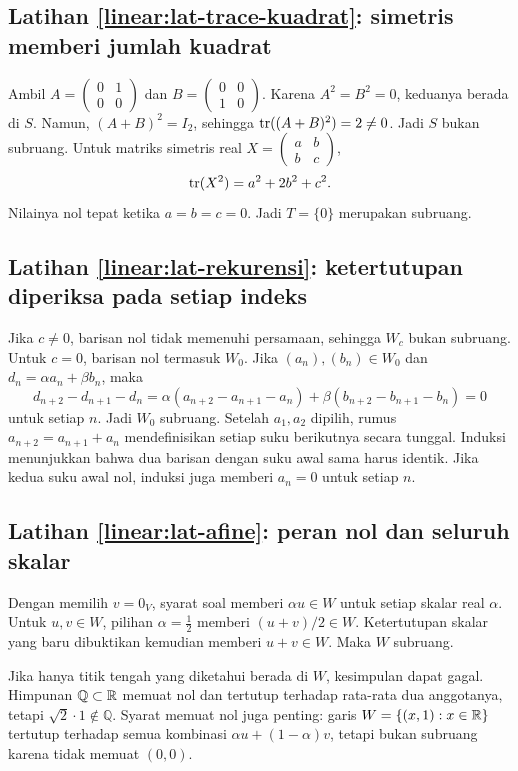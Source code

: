     \subsection*{Latihan \ref{linear:lat-trace-kuadrat}: simetris memberi jumlah kuadrat}
    Ambil $A=\begin{pmatrix}0&1\\0&0\end{pmatrix}$ dan
    $B=\begin{pmatrix}0&0\\1&0\end{pmatrix}$.
    Karena $A^2=B^2=0$, keduanya berada di $S$.
    Namun, $(A+B)^2=I_2$, sehingga $\operatorname{tr}((A+B)^2)=2\ne0$.
    Jadi $S$ bukan subruang.
    Untuk matriks simetris real $X=\begin{pmatrix}a&b\\b&c\end{pmatrix}$,
    \[
        \operatorname{tr}(X^2)=a^2+2b^2+c^2.
    \]
    Nilainya nol tepat ketika $a=b=c=0$. Jadi $T=\{0\}$ merupakan subruang.

    \subsection*{Latihan \ref{linear:lat-rekurensi}: ketertutupan diperiksa pada setiap indeks}
    Jika $c\ne0$, barisan nol tidak memenuhi persamaan, sehingga
    $W_c$ bukan subruang. Untuk $c=0$, barisan nol termasuk $W_0$.
    Jika $(a_n),(b_n)\in W_0$ dan $d_n=\alpha a_n+\beta b_n$, maka
    \[
        d_{n+2}-d_{n+1}-d_n
        =\alpha(a_{n+2}-a_{n+1}-a_n)
        +\beta(b_{n+2}-b_{n+1}-b_n)=0
    \]
    untuk setiap $n$. Jadi $W_0$ subruang.
    Setelah $a_1,a_2$ dipilih, rumus $a_{n+2}=a_{n+1}+a_n$
    mendefinisikan setiap suku berikutnya secara tunggal.
    Induksi menunjukkan bahwa dua barisan dengan suku awal sama
    harus identik. Jika kedua suku awal nol, induksi juga memberi
    $a_n=0$ untuk setiap $n$.

    \subsection*{Latihan \ref{linear:lat-afine}: peran nol dan seluruh skalar}
    Dengan memilih $v=0_V$, syarat soal memberi $\alpha u\in W$
    untuk setiap skalar real $\alpha$.
    Untuk $u,v\in W$, pilihan $\alpha=\tfrac12$ memberi
    $(u+v)/2\in W$. Ketertutupan skalar yang baru dibuktikan
    kemudian memberi $u+v\in W$. Maka $W$ subruang.

    Jika hanya titik tengah yang diketahui berada di $W$, kesimpulan
    dapat gagal. Himpunan $\mathbb Q\subset\mathbb{R}$ memuat nol dan tertutup
    terhadap rata-rata dua anggotanya, tetapi
    $\sqrt2\cdot1\notin\mathbb Q$.
    Syarat memuat nol juga penting: garis
    $W=\{(x,1):x\in\mathbb{R}\}$ tertutup terhadap semua kombinasi
    $\alpha u+(1-\alpha)v$, tetapi bukan subruang karena tidak memuat $(0,0)$.

